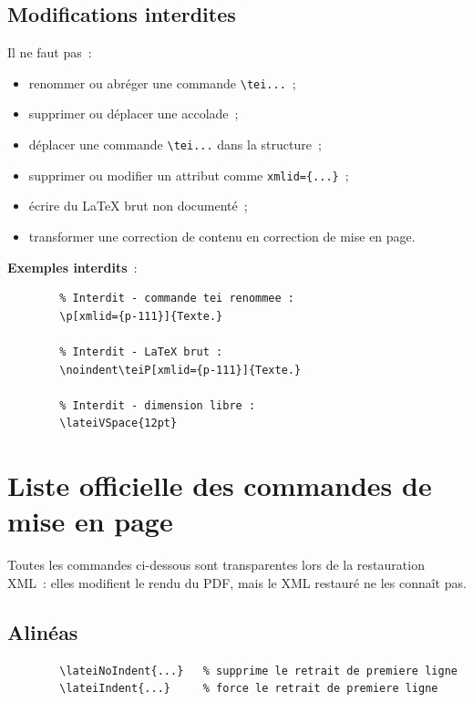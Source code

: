 \documentclass[11pt,a4paper]{article}
\newcommand{\cmd}[1]{\texttt{\textbackslash #1}}
\newcommand{\attrib}[1]{\texttt{#1}}
\begin{document}
	\subsection{Modifications interdites}
	
	Il ne faut pas~:
	
	\begin{itemize}
		\item renommer ou abréger une commande \cmd{tei...}~;
		\item supprimer ou déplacer une accolade~;
		\item déplacer une commande \cmd{tei...} dans la structure~;
		\item supprimer ou modifier un attribut comme \attrib{xmlid=\{...\}}~;
		\item écrire du LaTeX brut non documenté~;
		\item transformer une correction de contenu en correction de mise en page.
	\end{itemize}
	
	\textbf{Exemples interdits}~:
	
	\begin{lstlisting}
		% Interdit - commande tei renommee :
		\p[xmlid={p-111}]{Texte.}
		
		% Interdit - LaTeX brut :
		\noindent\teiP[xmlid={p-111}]{Texte.}
		
		% Interdit - dimension libre :
		\lateiVSpace{12pt}
	\end{lstlisting}
	
	\section{Liste officielle des commandes de mise en page}
	
	Toutes les commandes ci-dessous sont transparentes lors de la restauration
	XML~: elles modifient le rendu du PDF, mais le XML restauré ne les connaît
	pas.
	
	\subsection{Alinéas}
	
	\begin{lstlisting}
		\lateiNoIndent{...}   % supprime le retrait de premiere ligne
		\lateiIndent{...}     % force le retrait de premiere ligne
	\end{lstlisting}
	
\end{document}

